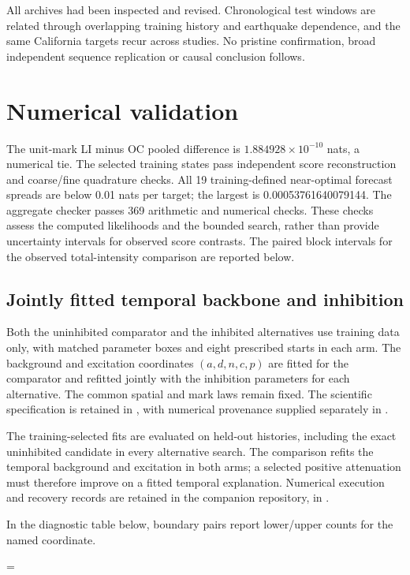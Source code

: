 All archives had been inspected and revised. Chronological test windows are related through overlapping training history and earthquake dependence, and the same California targets recur across studies. No pristine confirmation, broad independent sequence replication or causal conclusion follows.

\section{Numerical validation}
The unit-mark LI minus OC pooled difference is $1.884928\times10^{-10}$ nats, a numerical tie.
The selected training states pass independent score reconstruction and
coarse/fine quadrature checks. All 19 training-defined near-optimal forecast
spreads are below 0.01 nats per target; the largest is 0.00053761640079144.
The aggregate checker passes 369 arithmetic and numerical checks. These
checks assess the computed likelihoods and the bounded search, rather than
provide uncertainty intervals for observed score contrasts. The paired block
intervals for the observed total-intensity comparison are reported below.



\subsection{Jointly fitted temporal backbone and inhibition}
\label{sec:joint-disposition-methods}

Both the uninhibited comparator and the inhibited alternatives use training data only, with matched parameter boxes and eight prescribed starts in each arm. The background and excitation coordinates $(a,d,n,c,p)$ are fitted for the comparator and refitted jointly with the inhibition parameters for each alternative. The common spatial and mark laws remain fixed. The scientific specification is retained in , with numerical provenance supplied separately in .

The training-selected fits are evaluated on held-out histories, including the exact uninhibited candidate in every alternative search. The comparison refits the temporal background and excitation in both arms; a selected positive attenuation must therefore improve on a fitted temporal explanation. Numerical execution and recovery records are retained in the companion repository, in .

In the diagnostic table below, boundary pairs report lower/upper counts for the named coordinate.

\makeatletter
\begingroup
\interlinepenalty=\@M









\par
\endgroup
\makeatother


